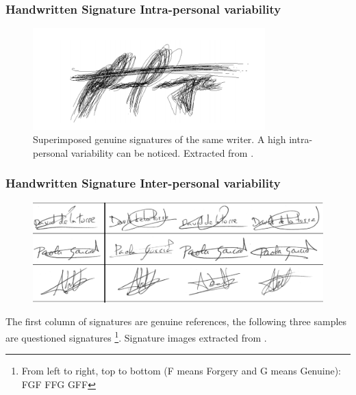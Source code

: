 \documentclass{beamer}
\begin{document}
\begin{frame}
\frametitle{Handwritten Signature Intra-personal variability}
\begin{figure}[!h]
\centering
\includegraphics[width=0.8\textwidth]{superimposed}
\caption{Superimposed genuine signatures of the same writer. A high intra-personal variability can be noticed. Extracted from \parencite{hafemann2015offline}. }
\label{fig:intraclass}
\end{figure}

\end{frame}

\begin{frame}
\frametitle{Handwritten Signature Inter-personal variability}
\begin{figure}[!htb]
\centering
\includegraphics[width=\textwidth]{forgeries}
\end{figure}

The first column of signatures are genuine references, the following three samples are questioned signatures \footnote{From left to right, top to bottom (F means Forgery and G means Genuine): FGF FFG GFF}. Signature images extracted from \parencite{mcyt-100}.
\end{frame}
\end{document}
